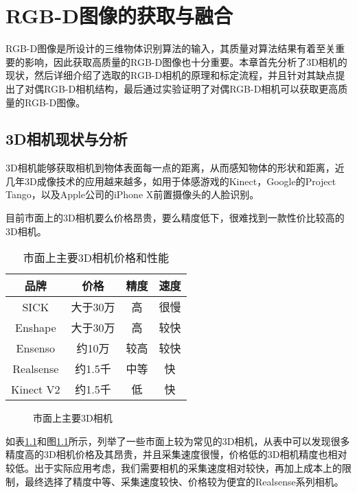 \chapter{RGB-D图像的获取与融合}
\label{chap:rgbd}
RGB-D图像是所设计的三维物体识别算法的输入，其质量对算法结果有着至关重要的影响，因此获取高质量的RGB-D图像也十分重要。本章首先分析了3D相机的现状，然后详细介绍了选取的RGB-D相机的原理和标定流程，并且针对其缺点提出了对偶RGB-D相机结构，最后通过实验证明了对偶RGB-D相机可以获取更高质量的RGB-D图像。

\section{3D相机现状与分析}
3D相机能够获取相机到物体表面每一点的距离，从而感知物体的形状和距离，近几年3D成像技术的应用越来越多，如用于体感游戏的Kinect\cite{kinect}，Google的Project Tango\cite{tango}，以及Apple公司的iPhone X前置摄像头的人脸识别。

目前市面上的3D相机要么价格昂贵，要么精度低下，很难找到一款性价比较高的3D相机。
\begin{table}[ht]
  \centering
  \begin{tabular}{cccc}
    \toprule
    品牌&价格&精度&速度 \\
    \midrule
    SICK&大于30万&高&很慢 \\
    Enshape&大于30万&高&较快 \\
    Ensenso&约10万&较高&较快 \\
    Realsense&约1.5千&中等&快 \\
    Kinect V2&约1.5千&低&快\\
    \bottomrule
  \end{tabular}
  \caption{市面上主要3D相机价格和性能}
  \label{tab:3d_camera}
\end{table}
\begin{figure}[ht]
  \centering
  \caption{市面上主要3D相机}
  \label{fig:3d_camera}
\end{figure}
如表\ref{tab:3d_camera}和图\ref{fig:3d_camera}所示，列举了一些市面上较为常见的3D相机，从表中可以发现很多精度高的3D相机价格及其昂贵，并且采集速度很慢，价格低的3D相机精度也相对较低。出于实际应用考虑，我们需要相机的采集速度相对较快，再加上成本上的限制，最终选择了精度中等、采集速度较快、价格较为便宜的Realsense系列相机。



